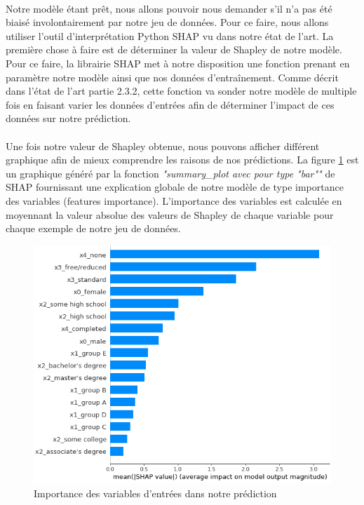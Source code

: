 \paragraph{}Notre modèle étant prêt, nous allons pouvoir nous demander s'il n'a pas été biaisé involontairement par notre jeu de données. Pour ce faire, nous allons utiliser l'outil d'interprétation Python SHAP vu dans notre état de l'art. La première chose à faire est de déterminer la valeur de Shapley de notre modèle. Pour ce faire, la librairie SHAP met à notre disposition une fonction prenant en paramètre notre modèle ainsi que nos données d'entraînement. Comme décrit dans l'état de l'art partie 2.3.2, cette fonction va sonder notre modèle de multiple fois en faisant varier les données d'entrées afin de déterminer l'impact de ces données sur notre prédiction.

\paragraph{}Une fois notre valeur de Shapley obtenue, nous pouvons afficher différent graphique afin de mieux comprendre les raisons de nos prédictions. La figure \ref{shapPlotBar} est un graphique généré par la fonction \textit{"summary\_plot avec pour type "bar""} de SHAP fournissant une explication globale de notre modèle de type importance des variables (features importance). L’importance des variables est calculée en moyennant la valeur absolue des valeurs de Shapley de chaque variable pour chaque exemple de notre jeu de données.

\begin{figure}[h]
    \includegraphics[scale=0.6]{src_img/shapPlotBar.png}
    \caption{Importance des variables d'entrées dans notre prédiction}
    \label{shapPlotBar}
\end{figure}

